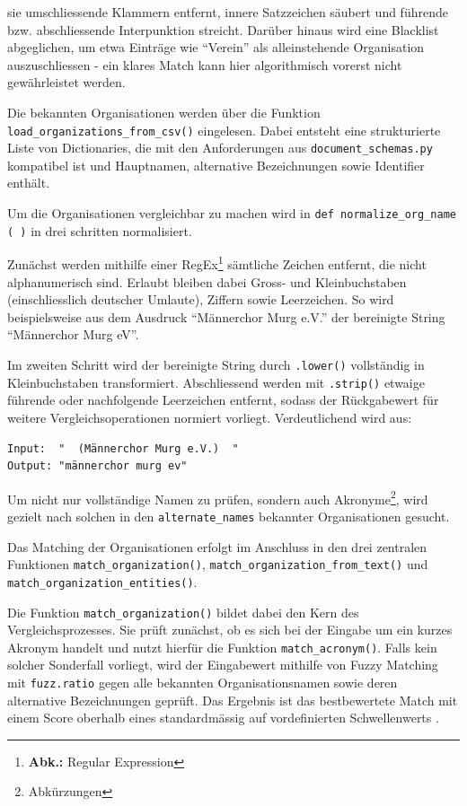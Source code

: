 \documentclass[12pt, a4paper, ngerman, bidi=default]{article}
\newcommand{\code}[1]{\colorbox{VeryLightGray}{\texttt{#1}}} %
\begin{document}
sie umschliessende Klammern entfernt, innere Satzzeichen säubert und führende bzw. abschliessende Interpunktion streicht. Darüber hinaus wird eine Blacklist abgeglichen, um etwa Einträge wie \enquote{Verein} als alleinstehende Organisation auszuschliessen - ein klares Match kann hier algorithmisch vorerst nicht gewährleistet werden.

Die bekannten Organisationen werden über die Funktion \code{load\_organizations\_from\_csv()} eingelesen. Dabei entsteht eine strukturierte Liste von Dictionaries, die mit den Anforderungen aus \code{document\_schemas.py} kompatibel ist und Hauptnamen, alternative Bezeichnungen sowie Identifier enthält.

Um die Organisationen vergleichbar zu machen wird in \code{def normalize\_org\_name ( )} in drei schritten normalisiert.

Zunächst werden mithilfe einer RegEx\footnote{\textbf{Abk.:} Regular Expression} sämtliche Zeichen entfernt, die nicht alphanumerisch sind. Erlaubt bleiben dabei Gross- und Kleinbuchstaben (einschliesslich deutscher Umlaute), Ziffern sowie Leerzeichen. So wird beispielsweise aus dem Ausdruck \enquote{Männerchor Murg e.V.} der bereinigte String \enquote{Männerchor Murg eV}.

Im zweiten Schritt wird der bereinigte String durch \code{.lower()} vollständig in Kleinbuchstaben transformiert.
Abschliessend werden mit \code{.strip()} etwaige führende oder nachfolgende Leerzeichen entfernt, sodass der Rückgabewert für weitere Vergleichsoperationen normiert vorliegt. Verdeutlichend wird aus:
\begin{verbatim}
Input:  "  (Männerchor Murg e.V.)  "
Output: "männerchor murg ev"
\end{verbatim}
Um nicht nur vollständige Namen zu prüfen, sondern auch Akronyme\footnote{Abkürzungen}, wird gezielt nach solchen in den \texttt{alternate\_names} bekannter Organisationen gesucht.
 
Das Matching der Organisationen erfolgt im Anschluss in den drei zentralen Funktionen \code{match\_organization()}, \code{match\_organization\_from\_text()} und \code{match\_organization\_entities()}.

Die Funktion \code{match\_organization()} bildet dabei den Kern des Vergleichsprozesses. Sie prüft zunächst, ob es sich bei der Eingabe um ein kurzes Akronym handelt und nutzt hierfür die Funktion \code{match\_acronym()}. Falls kein solcher Sonderfall vorliegt, wird der Eingabewert mithilfe von Fuzzy Matching mit \code{fuzz.ratio} gegen alle bekannten Organisationsnamen sowie deren alternative Bezeichnungen geprüft. Das Ergebnis ist das bestbewertete Match mit einem Score oberhalb eines standardmässig auf vordefinierten Schwellenwerts .
\end{document}
